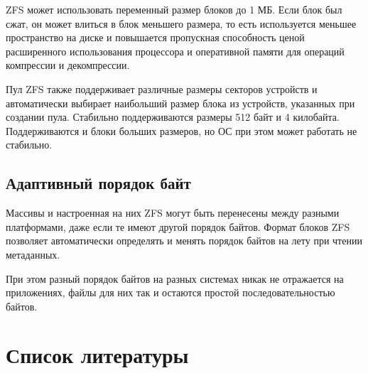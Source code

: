 \documentclass[a4page]{article}
\begin{document}
ZFS может использовать переменный размер блоков до 1 МБ.
Если блок был сжат, он может влиться в блок меньшего размера,
то есть используется меньшее пространство на диске и повышается пропускная способность
ценой расширенного использования процессора и оперативной памяти для операций компрессии и декомпрессии.

Пул ZFS также поддерживает различные размеры секторов устройств
и автоматически выбирает наибольший размер блока из устройств, указанных при создании пула.
Стабильно поддерживаются размеры 512 байт и 4 килобайта.
Поддерживаются и блоки больших размеров, но ОС при этом может работать не стабильно.

\subsection{Адаптивный порядок байт}

Массивы и настроенная на них ZFS могут быть перенесены между разными платформами,
даже если те имеют другой порядок байтов.
Формат блоков ZFS позволяет автоматически определять и менять порядок байтов на лету при чтении метаданных.

При этом разный порядок байтов на разных системах никак не отражается на приложениях,
файлы для них так и остаются простой последовательностью байтов.

\newpage

\section{Список литературы}

\printbibliography [heading=none]
\end{document}
